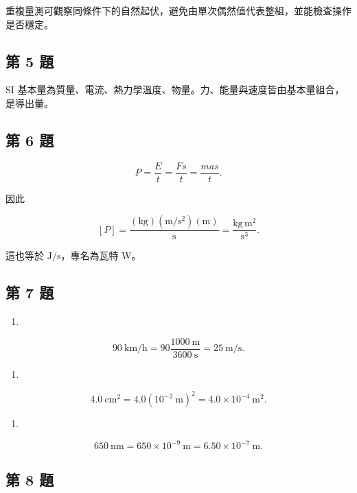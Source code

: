 \documentclass[11pt,a4paper]{article}
\providecommand{\tightlist}{%
  \setlength{\itemsep}{0pt}\setlength{\parskip}{0pt}}
\begin{document}
重複量測可觀察同條件下的自然起伏，避免由單次偶然值代表整組，並能檢查操作是否穩定。

\subsection{第 5 題}\label{ux7b2c-5-ux984c}

SI 基本量為質量、電流、熱力學溫度、物量。力、能量與速度皆由基本量組合，是導出量。

\subsection{第 6 題}\label{ux7b2c-6-ux984c}

\[
P=\frac Et=\frac{Fs}{t}=\frac{mas}{t}.
\]

因此

\[
[P]
=\frac{(\mathrm{kg})(\mathrm{m/s^2})(\mathrm m)}{\mathrm s}
=\frac{\mathrm{kg\,m^2}}{\mathrm{s^3}}.
\]

這也等於 \(\mathrm{J/s}\)，專名為瓦特 W。

\subsection{第 7 題}\label{ux7b2c-7-ux984c}

\begin{enumerate}
\def\labelenumi{(\arabic{enumi})}
\tightlist
\item
\end{enumerate}

\[
90\ \mathrm{km/h}
=90\frac{1000\ \mathrm m}{3600\ \mathrm s}
=25\ \mathrm{m/s}.
\]

\begin{enumerate}
\def\labelenumi{(\arabic{enumi})}
\setcounter{enumi}{1}
\tightlist
\item
\end{enumerate}

\[
4.0\ \mathrm{cm^2}
=4.0(10^{-2}\ \mathrm m)^2
=4.0\times10^{-4}\ \mathrm{m^2}.
\]

\begin{enumerate}
\def\labelenumi{(\arabic{enumi})}
\setcounter{enumi}{2}
\tightlist
\item
\end{enumerate}

\[
650\ \mathrm{nm}
=650\times10^{-9}\ \mathrm m
=6.50\times10^{-7}\ \mathrm m.
\]

\subsection{第 8 題}\label{ux7b2c-8-ux984c}
\end{document}
